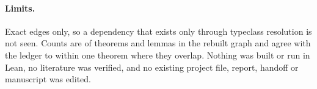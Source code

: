 \documentclass[11pt]{article}
\theoremstyle{remark}
\begin{document}
\paragraph{Limits.} Exact edges only, so a dependency that exists only through typeclass resolution is not seen. Counts are of theorems and lemmas in the rebuilt graph and agree with the ledger to within one theorem where they overlap. Nothing was built or run in Lean, no literature was verified, and no existing project file, report, handoff or manuscript was edited.
\end{document}
